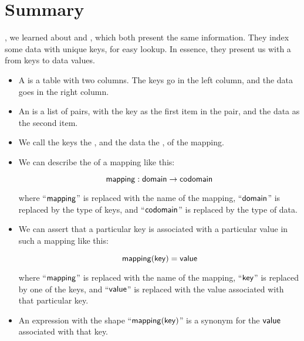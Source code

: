 \documentclass[../../../main.tex]{subfiles}
\begin{document}
\section{Summary}

, we learned about  and , which both present the same information. They index some data with unique keys, for easy lookup. In essence, they present us with a  from keys to data values.

\begin{itemize}

  \item A  is a table with two columns. The keys go in the left column, and the data goes in the right column.
  
  \item An  is a list of pairs, with the key as the first item in the pair, and the data as the second item. 
  
  \item We call the keys the , and the data the , of the mapping.
  
  \item We can describe the  of a mapping like this: 
  
  \begin{equation*}
    \mathsf{mapping : domain \rightarrow codomain}
  \end{equation*}
  
  where ``$\mathsf{mapping}$'' is replaced with the name of the mapping, ``$\mathsf{domain}$'' is replaced by the type of keys, and ``$\mathsf{codomain}$'' is replaced by the type of data. 
  
  \item We can assert that a particular key is associated with a particular value in such a mapping like this: 
  
  \begin{equation*}
    \mathsf{mapping(key) = value}
  \end{equation*}
  
  where ``$\mathsf{mapping}$'' is replaced with the name of the mapping, ``$\mathsf{key}$'' is replaced by one of the keys, and ``$\mathsf{value}$'' is replaced with the value associated with that particular key.
  
  \item An expression with the shape ``$\mathsf{mapping(key)}$'' is a synonym for the $\mathsf{value}$ associated with that key.

\end{itemize}
\end{document}
